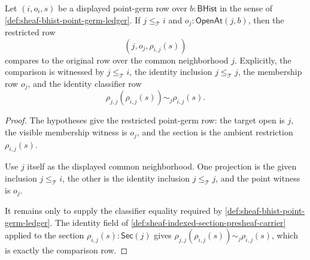 \begin{theorem}
\label{thm:sheaf-bhist-point-germ-restriction-readback}
Let $(i,o_i,s)$ be a displayed point-germ row over $b:\mathsf{BHist}$ in the sense of \autoref{def:sheaf-bhist-point-germ-ledger}. If $j\le_{\mathcal{T}}i$ and $o_j:\mathsf{OpenAt}(j,b)$, then the restricted row
$$
(j,o_j,\rho_{i,j}(s))
$$
compares to the original row over the common neighborhood $j$. Explicitly, the comparison is witnessed by $j\le_{\mathcal{T}}i$, the identity inclusion $j\le_{\mathcal{T}}j$, the membership row $o_j$, and the identity classifier row
$$
\rho_{j,j}(\rho_{i,j}(s))\sim_j\rho_{i,j}(s).
$$
\end{theorem}
\begin{proof}
The hypotheses give the restricted point-germ row: the target open is $j$, the visible membership witness is $o_j$, and the section is the ambient restriction $\rho_{i,j}(s)$.

Use $j$ itself as the displayed common neighborhood. One projection is the given inclusion $j\le_{\mathcal{T}}i$, the other is the identity inclusion $j\le_{\mathcal{T}}j$, and the point witness is $o_j$.

It remains only to supply the classifier equality required by \autoref{def:sheaf-bhist-point-germ-ledger}. The identity field of \autoref{def:sheaf-indexed-section-presheaf-carrier} applied to the section $\rho_{i,j}(s):\mathsf{Sec}(j)$ gives $\rho_{j,j}(\rho_{i,j}(s))\sim_j\rho_{i,j}(s)$, which is exactly the comparison row.
\end{proof}

